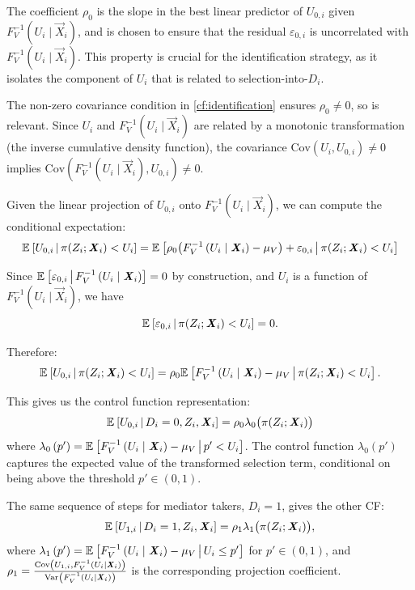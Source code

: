 The coefficient $\rho_0$ is the slope in the best linear predictor of $U_{0,i}$ given $F_V^{-1}\left( U_i \mid \vec{X}_i \right)$, and is chosen to ensure that the residual $\varepsilon_{0,i}$ is uncorrelated with $F_V^{-1}\left( U_i \mid \vec{X}_i \right)$.
This property is crucial for the identification strategy, as it isolates the component of $U_{i}$ that is related to selection-into-$D_i$.

The non-zero covariance condition in \ref{cf:identification} ensures $\rho_0 \neq 0$, so is relevant.
Since $U_i$ and $F_V^{-1}\left( U_i \mid \vec{X}_i \right)$ are related by a monotonic transformation (the inverse cumulative density function), the covariance $\text{Cov}(U_i, U_{0,i}) \neq 0$ implies $\text{Cov}(F_V^{-1}\left( U_i \mid \vec{X}_i \right), U_{0,i}) \neq 0$.

Given the linear projection of $U_{0,i}$ onto $F_V^{-1}\left( U_i \mid \vec{X}_i \right)$, we can compute the conditional expectation:
\[ \mathbb{E}_{} \left[ U_{0,i} \, \middle\vert \, \pi(Z_i; \boldsymbol{\mathit{X}}_i) < U_i \right] = \mathbb{E}_{} \left[ \rho_0\big(F_V^{-1}\left( U_i \mid \boldsymbol{\mathit{X}}_i \right) - \mu_V\big) + \varepsilon_{0,i} \, \middle\vert \, \pi(Z_i; \boldsymbol{\mathit{X}}_i) < U_i \right] \]

Since $\mathbb{E}_{} \left[ \varepsilon_{0,i} \, \middle\vert \, F_V^{-1}\left( U_i \mid \boldsymbol{\mathit{X}}_i \right) \right] = 0$ by construction, and $U_i$ is a function of $F_V^{-1}\left( U_i \mid \vec{X}_i \right)$, we have
\[ \mathbb{E}_{} \left[ \varepsilon_{0,i} \, \middle\vert \, \pi(Z_i; \boldsymbol{\mathit{X}}_i) < U_i \right] = 0. \]

Therefore:
\[ \mathbb{E}_{} \left[ U_{0,i} \, \middle\vert \, \pi(Z_i; \boldsymbol{\mathit{X}}_i) < U_i \right] = \rho_0 \mathbb{E}_{} \left[ F_V^{-1}\left( U_i \mid \boldsymbol{\mathit{X}}_i \right) - \mu_V \, \middle\vert \, \pi(Z_i; \boldsymbol{\mathit{X}}_i) < U_i \right]. \]

This gives us the control function representation:
\[ \mathbb{E}_{} \left[ U_{0,i} \, \middle\vert \, D_i=0, Z_i, \boldsymbol{\mathit{X}}_i \right] = \rho_0 \lambda_0\big(\pi(Z_i; \boldsymbol{\mathit{X}}_i)\big) \]
where $\lambda_0 \left(p'\right) = \mathbb{E}_{} \left[ F_V^{-1}\left( U_i \mid \boldsymbol{\mathit{X}}_i \right) - \mu_V \, \middle\vert \, p' < U_i \right]$.
The control function $\lambda_0\left(p'\right)$ captures the expected value of the transformed selection term, conditional on being above the threshold $p' \in (0,1)$.

The same sequence of steps for mediator takers, $D_i = 1$, gives the other CF:
\[ \mathbb{E}_{} \left[ U_{1,i} \, \middle\vert \, D_i=1, Z_i, \boldsymbol{\mathit{X}}_i \right] = \rho_1 \lambda_1\big(\pi(Z_i; \boldsymbol{\mathit{X}}_i)\big), \]
where $\lambda_1 \left(p'\right) = \mathbb{E}_{} \left[ F_V^{-1}\left( U_i \mid \boldsymbol{\mathit{X}}_i \right) - \mu_V \, \middle\vert \, U_i \leq p' \right]$ for $p' \in (0,1)$, and $\rho_1 = \frac{\text{Cov} \left( U_{1,i}, F_V^{-1}\left( U_i \mid \boldsymbol{\mathit{X}}_i \right) \right)}{\text{Var}_{} \left( F_V^{-1}\left( U_i \mid \boldsymbol{\mathit{X}}_i \right) \right)}$ is the corresponding projection coefficient.

